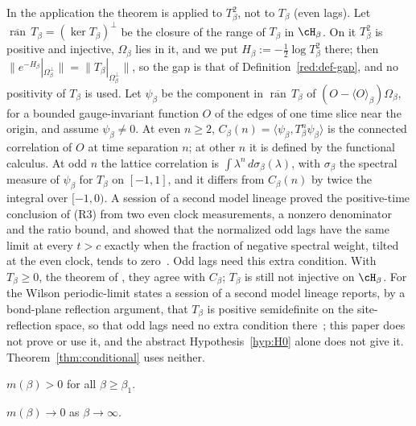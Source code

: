 In the application the theorem is applied to $T_\beta^2$, not to $T_\beta$ (even lags). Let $\overline{\operatorname{ran}}\,T_\beta=(\ker T_\beta)^\perp$ be the closure of the range of $T_\beta$ in $\cH_\beta$. On it $T_\beta^2$ is positive and injective, $\Omega_\beta$ lies in it, and we put $H_\beta:=-\tfrac12\log T_\beta^2$ there; then $\|e^{-H_\beta}|_{\Omega_\beta^\perp}\|=\|T_\beta|_{\Omega_\beta^\perp}\|$, so the gap is that of Definition~\ref{red:def-gap}, and no positivity of $T_\beta$ is used. Let $\psi_\beta$ be the component in $\overline{\operatorname{ran}}\,T_\beta$ of $(O-\langle O\rangle_\beta)\Omega_\beta$, for a bounded gauge-invariant function $O$ of the edges of one time slice near the origin, and assume $\psi_\beta\ne0$. At even $n\ge2$, $C_\beta(n)=\langle\psi_\beta,T_\beta^n\psi_\beta\rangle$ is the connected correlation of $O$ at time separation $n$; at other $n$ it is defined by the functional calculus. At odd $n$ the lattice correlation is $\int\lambda^n\,d\sigma_\beta(\lambda)$, with $\sigma_\beta$ the spectral measure of $\psi_\beta$ for $T_\beta$ on $[-1,1]$, and it differs from $C_\beta(n)$ by twice the integral over $[-1,0)$. A session of a second model lineage proved the positive-time conclusion of (R3) from two even clock measurements, a nonzero denominator and the ratio bound, and showed that the normalized odd lags have the same limit at every $t>c$ exactly when the fraction of negative spectral weight, tilted at the even clock, tends to zero~\cite[comment 7105014262]{RepoThread}. Odd lags need this extra condition. With $T_\beta\ge0$, the theorem of \cite{Lu77}, they agree with $C_\beta$; $T_\beta$ is still not injective on $\cH_\beta$. For the Wilson periodic-limit states a session of a second model lineage reports, by a bond-plane reflection argument, that $T_\beta$ is positive semidefinite on the site-reflection space, so that odd lags need no extra condition there~\cite[comment 7105972084]{RepoThread}; this paper does not prove or use it, and the abstract Hypothesis~\ref{hyp:H0} alone does not give it. Theorem~\ref{thm:conditional} uses neither.

\begin{hypothesis}\label{hyp:A}
$m(\beta)>0$ for all $\beta\ge\beta_1$.
\end{hypothesis}

\begin{hypothesis}\label{hyp:B}
$m(\beta)\to0$ as $\beta\to\infty$.
\end{hypothesis}

